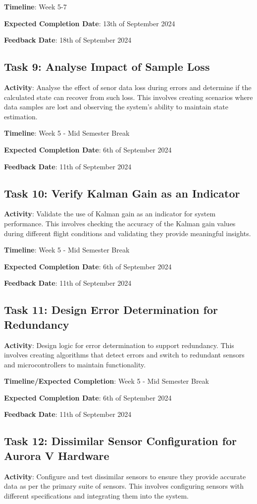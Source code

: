 \textbf{Timeline}: Week 5-7

\textbf{Expected Completion Date}: 13th of September 2024

\textbf{Feedback Date}: 18th of September 2024

\subsection{Task 9: Analyse Impact of Sample Loss}
\textbf{Activity}: Analyse the effect of senor data loss during errors and determine if the calculated state can recover from such loss. This involves creating scenarios where data samples are lost and observing the system's ability to maintain state estimation. 

\textbf{Timeline}: Week 5 - Mid Semester Break

\textbf{Expected Completion Date}: 6th of September 2024

\textbf{Feedback Date}: 11th of September 2024

\subsection{Task 10: Verify Kalman Gain as an Indicator}
\textbf{Activity}: Validate the use of Kalman gain as an indicator for system performance. This involves checking the accuracy of the Kalman gain values during different flight conditions and validating they provide meaningful insights. 

\textbf{Timeline}: Week 5 - Mid Semester Break

\textbf{Expected Completion Date}: 6th of September 2024

\textbf{Feedback Date}: 11th of September 2024

\subsection{Task 11: Design Error Determination for Redundancy}
\textbf{Activity}: Design logic for error determination to support redundancy. This involves creating algorithms that detect errors and switch to redundant sensors and microcontrollers to maintain functionality. 

\textbf{Timeline/Expected Completion}: Week 5 - Mid Semester Break

\textbf{Expected Completion Date}: 6th of September 2024

\textbf{Feedback Date}: 11th of September 2024

\subsection{Task 12: Dissimilar Sensor Configuration for Aurora V Hardware}
\textbf{Activity}: Configure and test dissimilar sensors to ensure they provide accurate data as per the primary suite of sensors. This involves configuring sensors with different specifications and integrating them into the system.

